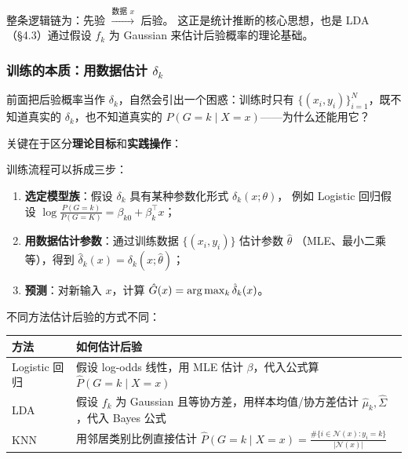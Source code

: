 整条逻辑链为：先验 $\xrightarrow{\text{数据 }x}$ 后验。
这正是统计推断的核心思想，也是 LDA（§4.3）通过假设 $f_k$ 为 Gaussian 来估计后验概率的理论基础。

\subsubsection{训练的本质：用数据估计 $\delta_k$}

前面把后验概率当作 $\delta_k$，自然会引出一个困惑：训练时只有 $\{(x_i, y_i)\}_{i=1}^{N}$，既不知道真实的 $\delta_k$，也不知道真实的 $P(G=k\mid X=x)$——为什么还能用它？

关键在于区分\textbf{理论目标}和\textbf{实践操作}：

\begin{center}
\end{center}

\begin{center}
\end{center}

训练流程可以拆成三步：
\begin{enumerate}[label=(\arabic*)]
    \item \textbf{选定模型族}：假设 $\delta_k$ 具有某种参数化形式 $\delta_k(x; \theta)$，
    例如 Logistic 回归假设 $\log\frac{P(G=k)}{P(G=K)} = \beta_{k0} + \beta_k^\top x$；
    \item \textbf{用数据估计参数}：通过训练数据 $\{(x_i, y_i)\}$ 估计参数 $\hat{\theta}$
    （MLE、最小二乘等），得到 $\hat{\delta}_k(x) = \delta_k(x; \hat{\theta})$；
    \item \textbf{预测}：对新输入 $x$，计算 $\hat{G}(x) = \arg\max_k \hat{\delta}_k(x)$。
\end{enumerate}

不同方法估计后验的方式不同：

\begin{center}
\begin{tabular}{ll}
\toprule
方法 & 如何估计后验 \\
\midrule
Logistic 回归 & 假设 log-odds 线性，用 MLE 估计 $\beta$，代入公式算 $\hat{P}(G=k\mid X=x)$ \\
LDA & 假设 $f_k$ 为 Gaussian 且等协方差，用样本均值/协方差估计 $\hat{\mu}_k, \hat{\Sigma}$，代入 Bayes 公式 \\
KNN & 用邻居类别比例直接估计 $\hat{P}(G=k\mid X=x) = \frac{\#\{i\in\mathcal{N}(x): y_i=k\}}{|\mathcal{N}(x)|}$ \\
\bottomrule
\end{tabular}
\end{center}


